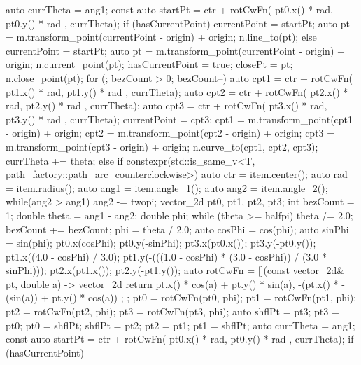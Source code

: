 \begin{codeblock}
{{{        auto currTheta = ang1;
        const auto startPt =
        ctr + rotCwFn({ pt0.x() * rad, pt0.y() * rad }, currTheta);
        if (hasCurrentPoint) {
          currentPoint = startPt;
          auto pt = m.transform_point(currentPoint - origin) + origin;
          n.line_to(pt);
        }
        else {
          currentPoint = startPt;
          auto pt = m.transform_point(currentPoint - origin) + origin;
          n.current_point(pt);
          hasCurrentPoint = true;
          closePt = pt;
          n.close_point(pt);
        }
        for (; bezCount > 0; bezCount--) {
          auto cpt1 = ctr + rotCwFn({ pt1.x() * rad, pt1.y() * rad }, currTheta);
          auto cpt2 = ctr + rotCwFn({ pt2.x() * rad, pt2.y() * rad }, currTheta);
          auto cpt3 = ctr + rotCwFn({ pt3.x() * rad, pt3.y() * rad }, currTheta);
          currentPoint = cpt3;
          cpt1 = m.transform_point(cpt1 - origin) + origin;
          cpt2 = m.transform_point(cpt2 - origin) + origin;
          cpt3 = m.transform_point(cpt3 - origin) + origin;
          n.curve_to(cpt1, cpt2, cpt3);
          currTheta += theta;
        }
      }
      else if constexpr(std::is_same_v<T, path_factory::path_arc_counterclockwise>) {
      {
        auto ctr = item.center();
        auto rad = item.radius();
        auto ang1 = item.angle_1();
        auto ang2 = item.angle_2();
        while(ang2 > ang1) {
          ang2 -= twopi;
        }
        vector_2d pt0, pt1, pt2, pt3;
        int bezCount = 1;
        double theta = ang1 - ang2;
        double phi;
        while (theta >= halfpi) {
          theta /= 2.0;
          bezCount += bezCount;
        }
        phi = theta / 2.0;
        auto cosPhi = cos(phi);
        auto sinPhi = sin(phi);
        pt0.x(cosPhi);
        pt0.y(-sinPhi);
        pt3.x(pt0.x());
        pt3.y(-pt0.y());
        pt1.x((4.0 - cosPhi) / 3.0);
        pt1.y(-(((1.0 - cosPhi) * (3.0 - cosPhi)) / (3.0 * sinPhi)));
        pt2.x(pt1.x());
        pt2.y(-pt1.y());
        auto rotCwFn = [](const vector_2d& pt, double a) -> vector_2d {
          return { pt.x() * cos(a) + pt.y() * sin(a),
            -(pt.x() * -(sin(a)) + pt.y() * cos(a)) };
        };
        pt0 = rotCwFn(pt0, phi);
        pt1 = rotCwFn(pt1, phi);
        pt2 = rotCwFn(pt2, phi);
        pt3 = rotCwFn(pt3, phi);
        auto shflPt = pt3;
        pt3 = pt0;
        pt0 = shflPt;
        shflPt = pt2;
        pt2 = pt1;
        pt1 = shflPt;
        auto currTheta = ang1;
        const auto startPt =
        ctr + rotCwFn({ pt0.x() * rad, pt0.y() * rad }, currTheta);
        if (hasCurrentPoint) {
}}}}}
\end{codeblock}
